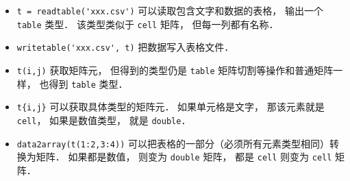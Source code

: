 
\begin{issues}
\issueDraft
\end{issues}

\begin{itemize}
\item \verb|t = readtable('xxx.csv')| 可以读取包含文字和数据的表格， 输出一个 \verb|table| 类型． 该类型类似于 \verb|cell| 矩阵， 但每一列都有名称．
\item \verb|writetable('xxx.csv', t)| 把数据写入表格文件．
\item \verb|t(i,j)| 获取矩阵元， 但得到的类型仍是 \verb|table| 矩阵切割等操作和普通矩阵一样， 也得到 \verb|table| 类型．
\item \verb|t{i,j}| 可以获取具体类型的矩阵元． 如果单元格是文字， 那该元素就是 \verb|cell|， 如果是数值类型， 就是 \verb|double|．
\item \verb|data2array(t(1:2,3:4))|  可以把表格的一部分（必须所有元素类型相同）转换为矩阵． 如果都是数值， 则变为 \verb|double| 矩阵， 都是 \verb|cell| 则变为 \verb|cell| 矩阵．
\end{itemize}
